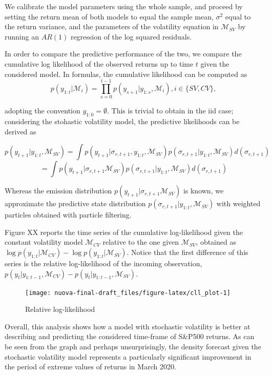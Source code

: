 \documentclass[
]{book}
\theoremstyle{break}
\theoremstyle{nonumberplain}
\begin{document}
We calibrate the model parameters using the whole sample, and proceed by
setting the return mean of both models to equal the sample mean,
\(\sigma^{2}\) equal to the return variance, and the parameters of the
volatility equation in \(\mathcal{M}_{SV}\) by running an \(AR(1)\)
regression of the log squared residuals.

In order to compare the predictive performance of the two, we compare
the cumulative log likelihood of the observed returns up to time \(t\)
given the considered model. In formulas, the cumulative likelihood can
be computed as \[
p(y_{1:t}|\mathcal{M}_{i})=\prod_{s=0}^{t-1}p(y_{s+1}|y_{1:s},\mathcal{M}_{i}),i\in\{SV,CV\},
\]

adopting the convention \(y_{1:0}=\emptyset\). This is trivial to obtain
in the iid case; considering the stohastic volatility model, the
predictive likelihoods can be derived as

\[
p(y_{t+1}|y_{1:t},\mathcal{M}_{SV})=\int p(y_{t+1}|\sigma_{r,t+1},y_{1:t},\mathcal{M}_{SV})p(\sigma_{r,t+1}|y_{1:t},\mathcal{M}_{SV})d(\sigma_{r,t+1})
\] \[
=\int p(y_{t+1}|\sigma_{r,t+1}\mathcal{M}_{SV})p(\sigma_{r,t+1}|y_{1:t},\mathcal{M}_{SV})d(\sigma_{r,t+1})
\]

Whereas the emission distribution
\(p(y_{t+1}|\sigma_{r,t+1}\mathcal{M}_{SV})\) is known, we approximate
the predictive state distribution
\(p(\sigma_{r,t+1}|y_{1:t},\mathcal{M}_{SV})\) with weighted particles
obtained with particle filtering.

Figure XX reports the time series of the cumulative log-likelihood given
the constant volatility model \(\mathcal{M}_{CV}\) relative to the one
given \(\mathcal{M}_{SV}\), obtained as
\(\log p(y_{1:t}|\mathcal{M}_{CV})-\log p(y_{1:t}|\mathcal{M}_{SV})\).
Notice that the first difference of this series is the relative
log-likelihood of the incoming observation,
\(p(y_{t}|y_{1:t-1},\mathcal{M}_{CV})-p(y_{t}|y_{1:t-1},\mathcal{M}_{SV})\).

\begin{figure}[H]

{\centering \texttt{[image: nuova-final-draft\_files/figure-latex/cll\_plot-1]} 

}

\caption{Relative log-likelihood}\label{fig:cll_plot}
\end{figure}

Overall, this analysis shows how a model with stochastic volatility is
better at describing and predicting the considered time-frame of S\&P500
returns. As can be seen from the graph and perhaps unsurprisingly, the
density forecast given the stochastic volatility model represents a
particularly significant improvement in the period of extreme values of
returns in March 2020.

\backmatter
\end{document}

